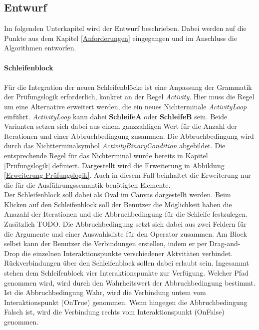     \subsection{Entwurf}
    Im folgenden Unterkapitel wird der Entwurf beschrieben.
    Dabei werden auf die Punkte aus dem Kapitel \ref{Anforderungen} eingegangen und im Anschluss die Algorithmen entworfen.\\
    \\
    \textbf{Schleifenblock}\\
    \\
    Für die Integration der neuen Schleifenblöcke ist eine Anpassung der Grammatik der Prüfungslogik erforderlich, konkret an der Regel \textit{Activity}.    
    Hier muss die Regel um eine Alternative erweitert werden, die ein neues Nichterminale \textit{ActivityLoop} einführt.
    \textit{ActivityLoop} kann dabei \textbf{SchleifeA} oder \textbf{SchleifeB} sein.
    Beide Varianten setzen sich dabei aus einem ganzzahligen Wert für die Anzahl der Iterationen und einer Abbruchbedingung zusammen.
    Die Abbruchbedingung wird durch das Nichtterminalsymbol \textit{ActivityBinaryCondition} abgebildet.
    Die entsprechende Regel für das Nichterminal wurde bereits in Kapitel \ref{Prüfungslogik} definiert.
    Dargestellt wird die Erweiterung in Abbildung \ref{Erweiterung Prüfungslogik}.
    Auch in diesem Fall beinhaltet die Erweiterung nur die für die Ausführungssemantik benötigten Elemente.\\
    Der Schleifenblock soll dabei als Oval im Canvas dargestellt werden.
    Beim Klicken auf den Schleifenblock soll der Benutzer die Möglichkeit haben die Anazahl der Iterationen und die Abbruchbedingung für die Schleife festzulegen.
    Zusätzlich TODO.
    Die Abbruchbedingung setzt sich dabei aus zwei Feldern für die Argumente und einer Auswahlsliste für den Operator zusammen.
    Am Block selbst kann der Benutzer die Verbindungen erstellen, indem er per Drag-and-Drop die einzelnen Interaktionspunkte verschiedener Aktvitäten verbindet.
    Rückverbindungen über den Schleifenblock sollen dabei erlaubt sein.
    Ingesammt stehen dem Schleifenblock vier Interaktionspunkte zur Verfügung.
    Welcher Pfad genommen wird, wird durch den Wahrheitswert der Abbruchbedingung bestimmt.
    Ist die Abbruchbedingung Wahr, wird die Verbindung untem vom Interaktionspunkt (OnTrue) genommen.
    Wenn hingegen die Abbruchbedingung Falsch ist, wird die Verbindung rechts vom Interaktionspunkt (OnFalse) genommen.\\
